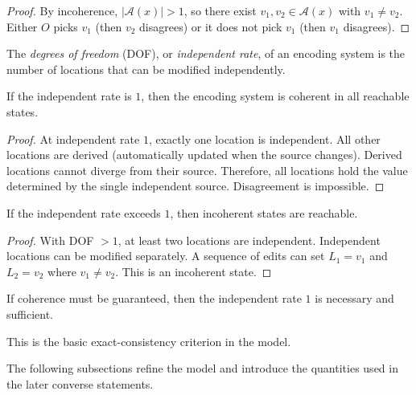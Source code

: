 \begin{proof}
By incoherence, $|\mathcal A(x)|>1$, so there exist $v_1,v_2\in\mathcal A(x)$ with $v_1\neq v_2$. Either $O$ picks $v_1$ (then $v_2$ disagrees) or it does not pick $v_1$ (then $v_1$ disagrees).
\end{proof}

\begin{definition}\label{def:dof-epistemic}
The \emph{degrees of freedom} (DOF), or \emph{independent rate}, of an encoding system is the number of locations that can be modified independently.
\end{definition}

\begin{theorem}\label{thm:dof-one-coherence}
If the independent rate is $1$, then the encoding system is coherent in all reachable states.
\end{theorem}

\begin{proof}
At independent rate $1$, exactly one location is independent. All other locations are derived (automatically updated when the source changes). Derived locations cannot diverge from their source. Therefore, all locations hold the value determined by the single independent source. Disagreement is impossible.
\end{proof}

\begin{theorem}\label{thm:dof-gt-one-incoherence}
If the independent rate exceeds $1$, then incoherent states are reachable.
\end{theorem}

\begin{proof}
With DOF $> 1$, at least two locations are independent. Independent locations can be modified separately. A sequence of edits can set $L_1 = v_1$ and $L_2 = v_2$ where $v_1 \neq v_2$. This is an incoherent state.
\end{proof}

\begin{corollary}\label{cor:coherence-forces-ssot}
If coherence must be guaranteed, then the independent rate $1$ is necessary and sufficient.
\end{corollary}

This is the basic exact-consistency criterion in the model.

The following subsections refine the model and introduce the quantities used in the later converse statements.

